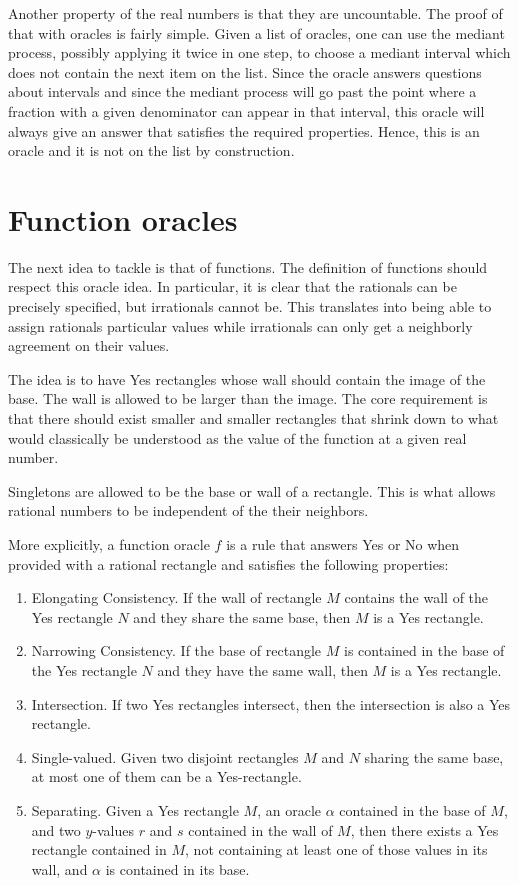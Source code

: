 \documentclass[12pt]{article}
\theoremstyle{remark}
\begin{document}
Another property of the real numbers is that they are uncountable. The proof of that with oracles is fairly simple. Given a list of oracles, one can use the mediant process, possibly applying it twice in one step, to choose a mediant interval which does not contain the next item on the list. Since the oracle answers questions about intervals and since the mediant process will go past the point where a fraction with a given denominator can appear in that interval, this oracle will always give an answer that satisfies the required properties.  Hence, this is an oracle and it is not on the list by construction. 

\section{Function oracles}

The next idea to tackle is that of functions. The definition of functions should respect this oracle idea.  In particular, it is clear that the rationals can be precisely specified, but irrationals cannot be. This translates into being able to assign rationals particular values while irrationals can only get a neighborly agreement on their values. 

The idea is to have Yes rectangles whose wall should contain the image of the base. The wall is allowed to be larger than the image. The core requirement is that there should exist smaller and smaller rectangles that shrink down to what would classically be understood as the value of the function at a given real number. 

Singletons are allowed to be the base or wall of a rectangle. This is what allows rational numbers to be independent of the their neighbors.

More explicitly, a function oracle $f$ is a rule that answers Yes or No when provided with a rational rectangle and satisfies the following properties: 
\begin{enumerate}
    \item Elongating Consistency. If the wall of rectangle $M$ contains the wall of the Yes rectangle $N$ and they share the same base, then $M$ is a Yes rectangle. 
    \item Narrowing Consistency. If the base of rectangle $M$ is contained in the base of the Yes rectangle $N$ and they have the same wall, then $M$ is a Yes rectangle.  
    \item Intersection. If two Yes rectangles intersect, then the intersection is also a Yes rectangle. 
    \item Single-valued. Given two disjoint rectangles $M$ and $N$ sharing the same base, at most one of them can be a Yes-rectangle. 
    \item Separating. Given a Yes rectangle $M$, an oracle $\alpha$ contained in the base of $M$, and two $y$-values $r$ and $s$ contained in the wall of $M$, then there exists a Yes rectangle contained in $M$, not containing at least one of those values in its wall, and $\alpha$ is contained in its base.
\end{enumerate} 
\end{document}
